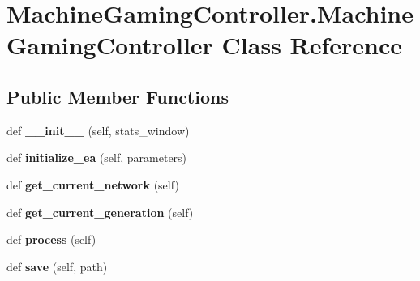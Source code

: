\hypertarget{classMachineGamingController_1_1MachineGamingController}{}\section{Machine\+Gaming\+Controller.\+Machine\+Gaming\+Controller Class Reference}
\label{classMachineGamingController_1_1MachineGamingController}
\subsection*{Public Member Functions}
\begin{DoxyCompactItemize}
\item 
def {\bfseries \+\_\+\+\_\+init\+\_\+\+\_\+} (self, stats\+\_\+window)\hypertarget{classMachineGamingController_1_1MachineGamingController_a0552527740e7e5e6a58d2babbe00387a}{}\label{classMachineGamingController_1_1MachineGamingController_a0552527740e7e5e6a58d2babbe00387a}

\item 
def {\bfseries initialize\+\_\+ea} (self, parameters)\hypertarget{classMachineGamingController_1_1MachineGamingController_a7eebd5e59bc078c01bf3057684c54547}{}\label{classMachineGamingController_1_1MachineGamingController_a7eebd5e59bc078c01bf3057684c54547}

\item 
def {\bfseries get\+\_\+current\+\_\+network} (self)\hypertarget{classMachineGamingController_1_1MachineGamingController_aa5f25a8c5bf4cbc0e9dc4f6ad7c1cce5}{}\label{classMachineGamingController_1_1MachineGamingController_aa5f25a8c5bf4cbc0e9dc4f6ad7c1cce5}

\item 
def {\bfseries get\+\_\+current\+\_\+generation} (self)\hypertarget{classMachineGamingController_1_1MachineGamingController_ac90fcf35b4ae810843b5420e1160b0c4}{}\label{classMachineGamingController_1_1MachineGamingController_ac90fcf35b4ae810843b5420e1160b0c4}

\item 
def {\bfseries process} (self)\hypertarget{classMachineGamingController_1_1MachineGamingController_a1bf9bfb9f213daf15538668353af3307}{}\label{classMachineGamingController_1_1MachineGamingController_a1bf9bfb9f213daf15538668353af3307}

\item 
def {\bfseries save} (self, path)\hypertarget{classMachineGamingController_1_1MachineGamingController_a3bfaf926c88d2d4658cac9a31d68cbc5}{}\label{classMachineGamingController_1_1MachineGamingController_a3bfaf926c88d2d4658cac9a31d68cbc5}


\end{DoxyCompactItemize}
